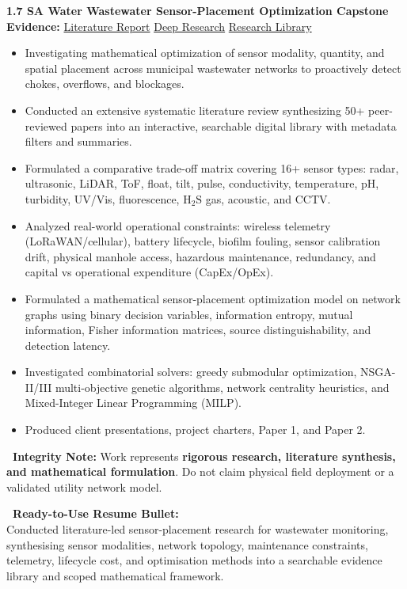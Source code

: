 \documentclass[10pt,a4paper]{article}
\newcommand{\statusprogress}{\tcbox[on line, colback=progressbg, colframe=progress!50!white, size=small, arc=2pt, boxrule=0.5pt]{\scriptsize\bfseries\color{progress}\faIcon{spinner}\ IN PROGRESS}}
\begin{document}
\begin{projectcard}
  \textbf{\large 1.7 SA Water Wastewater Sensor-Placement Optimization Capstone} \hfill \statusprogress\\[2pt]
  {\footnotesize\color{textmuted}\textbf{Evidence:} \underline{Literature Report} \quad\textbar\quad \underline{Deep Research} \quad\textbar\quad \underline{Research Library}}
  \begin{itemize}[leftmargin=14pt, itemsep=1.5pt, topsep=2pt]
    \item Investigating mathematical optimization of sensor modality, quantity, and spatial placement across municipal wastewater networks to proactively detect chokes, overflows, and blockages.
    \item Conducted an extensive systematic literature review synthesizing 50+ peer-reviewed papers into an interactive, searchable digital library with metadata filters and summaries.
    \item Formulated a comparative trade-off matrix covering 16+ sensor types: radar, ultrasonic, LiDAR, ToF, float, tilt, pulse, conductivity, temperature, pH, turbidity, UV/Vis, fluorescence, $\text{H}_2\text{S}$ gas, acoustic, and CCTV.
    \item Analyzed real-world operational constraints: wireless telemetry (LoRaWAN/cellular), battery lifecycle, biofilm fouling, sensor calibration drift, physical manhole access, hazardous maintenance, redundancy, and capital vs operational expenditure (CapEx/OpEx).
    \item Formulated a mathematical sensor-placement optimization model on network graphs using binary decision variables, information entropy, mutual information, Fisher information matrices, source distinguishability, and detection latency.
    \item Investigated combinatorial solvers: greedy submodular optimization, NSGA-II/III multi-objective genetic algorithms, network centrality heuristics, and Mixed-Integer Linear Programming (MILP).
    \item Produced client presentations, project charters, Paper 1, and Paper 2.
  \end{itemize}
  \begin{metricsbox}[colback=prototypebg!35!white, colframe=prototype!50!white, fontupper=\footnotesize\color{prototype!90!black}]
    \textbf{\ Integrity Note:} Work represents \textbf{rigorous research, literature synthesis, and mathematical formulation}. Do not claim physical field deployment or a validated utility network model.
  \end{metricsbox}
  \begin{resumebox}
    \textbf{\color{accent}\ Ready-to-Use Resume Bullet:}\\
    Conducted literature-led sensor-placement research for wastewater monitoring, synthesising sensor modalities, network topology, maintenance constraints, telemetry, lifecycle cost, and optimisation methods into a searchable evidence library and scoped mathematical framework.
  \end{resumebox}
\end{projectcard}
\end{document}
